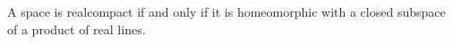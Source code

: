 A space is realcompact if and only if it is homeomorphic with a closed subspace of a product of real lines.
